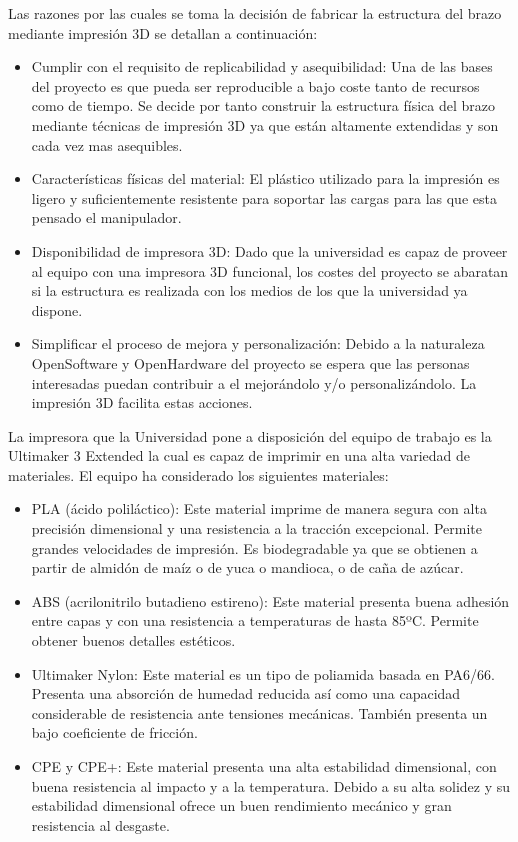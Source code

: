 Las razones por las cuales se toma la decisión de fabricar la estructura del brazo mediante impresión 3D se detallan a continuación:

\begin{itemize}
  \item Cumplir con el requisito de replicabilidad y asequibilidad: Una de las bases del proyecto es que pueda ser reproducible a bajo coste tanto de recursos como de tiempo. Se decide por tanto construir la estructura física del brazo mediante técnicas de impresión 3D ya que están altamente extendidas y son cada vez mas asequibles.
  
  \item Características físicas del material: El plástico utilizado para la impresión es ligero y suficientemente resistente para soportar las cargas para las que esta pensado el manipulador.
  
  \item Disponibilidad de impresora 3D: Dado que la universidad es capaz de proveer al equipo con una impresora 3D funcional, los costes del proyecto se abaratan si la estructura es realizada con los medios de los que la universidad ya dispone.
  
  \item Simplificar el proceso de mejora y personalización: Debido a la naturaleza OpenSoftware y OpenHardware del proyecto se espera que las personas interesadas puedan contribuir a el mejorándolo y/o personalizándolo. La impresión 3D facilita estas acciones.
\end{itemize}

La impresora que la Universidad pone a disposición del equipo de trabajo es la Ultimaker 3 Extended la cual es capaz de imprimir en una alta variedad de materiales. El equipo ha considerado los siguientes materiales:

\begin{itemize}
    \item PLA (ácido poliláctico)\cite{noauthor_acido_2020}: Este material imprime de manera segura con alta precisión dimensional y una resistencia a la tracción excepcional. Permite grandes velocidades de impresión. Es biodegradable ya que se obtienen a partir de almidón de maíz o de yuca o mandioca, o de caña de azúcar. 
    \item ABS (acrilonitrilo butadieno estireno)\cite{noauthor_acrilonitrilo_2020}: Este material presenta buena adhesión entre capas y con una resistencia a temperaturas de hasta 85ºC. Permite obtener buenos detalles estéticos.
    \item Ultimaker Nylon: Este material es un tipo de poliamida basada en PA6/66. Presenta una absorción de humedad reducida así como una capacidad considerable de resistencia ante tensiones mecánicas. También presenta un bajo coeficiente de fricción.
    \item CPE y CPE+: Este material presenta una alta estabilidad dimensional, con buena resistencia al impacto y a la temperatura. Debido a su alta solidez y su estabilidad dimensional ofrece un buen rendimiento mecánico y gran resistencia al desgaste.
\end{itemize}


